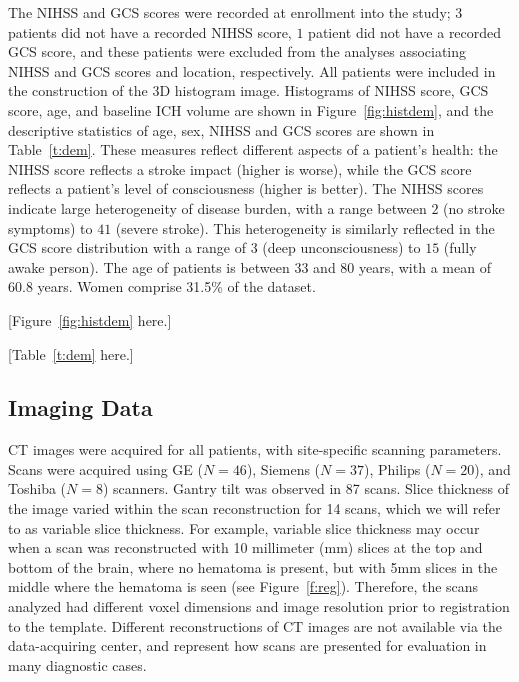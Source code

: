 \documentclass[10pt]{article}\usepackage[]{graphicx}\usepackage[]{color}
\begin{document}
%
                 
The NIHSS and GCS scores were recorded at enrollment into the study; $3$ patients did not have a recorded NIHSS score, $1$ patient did not have a recorded GCS score, and these patients were excluded from the analyses associating NIHSS and GCS scores and location, respectively.  All patients were included in the construction of the 3D histogram image.  Histograms of NIHSS score, GCS score, age, and baseline ICH volume are shown in Figure~\ref{fig:histdem}, and the descriptive statistics of age, sex, NIHSS and GCS scores are shown in Table~\ref{t:dem}. These measures reflect different aspects of a patient's health: the NIHSS score reflects a stroke impact (higher is worse), while the GCS score reflects a patient's level of consciousness (higher is better).  The NIHSS scores indicate large heterogeneity of disease burden, with a range between $2$ (no stroke symptoms) to $41$ (severe stroke).  This heterogeneity is similarly reflected in the GCS score distribution with a range of $3$ (deep unconsciousness) to $15$ (fully awake person). The age of patients is between 33 and 80 years, with a mean of 60.8 years.  Women comprise 31.5\% of the dataset.

[Figure~\ref{fig:histdem} here.]

[Table~\ref{t:dem} here.]



\subsection{Imaging Data}
CT images were acquired for all patients, with site-specific scanning parameters.  Scans were acquired using GE ($N=46$), Siemens ($N=37$), Philips ($N=20$), and Toshiba ($N=8$) scanners. Gantry tilt was observed in 87 scans.  Slice thickness of the image varied within the scan reconstruction for 14 scans, which we will refer to as variable slice thickness. For example, variable slice thickness may occur when a scan was reconstructed with 10 millimeter (mm) slices at the top and bottom of the brain, where no hematoma is present, but with 5mm slices in the middle where the hematoma is seen (see Figure~\ref{f:reg}\protect{}).  Therefore, the scans analyzed had different voxel dimensions and image resolution prior to registration to the template.  Different reconstructions of CT images are not available via the data-acquiring center, and represent how scans are presented for evaluation in many diagnostic cases.
\end{document}
